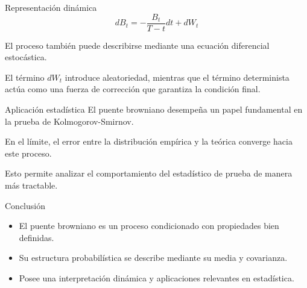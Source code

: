\documentclass{beamer}
\begin{document}
\begin{frame}{Representación dinámica}
\[
dB_t = -\frac{B_t}{T - t}dt + dW_t
\]

El proceso también puede describirse mediante una ecuación diferencial estocástica.

\vspace{0.3cm}
El término $dW_t$ introduce aleatoriedad, mientras que el término determinista actúa como una fuerza de corrección que garantiza la condición final.
\end{frame}

\begin{frame}{Aplicación estadística}
El puente browniano desempeña un papel fundamental en la prueba de Kolmogorov-Smirnov.

\vspace{0.3cm}
En el límite, el error entre la distribución empírica y la teórica converge hacia este proceso.

\vspace{0.3cm}
Esto permite analizar el comportamiento del estadístico de prueba de manera más tractable.
\end{frame}

\begin{frame}{Conclusión}
\begin{itemize}
    \item El puente browniano es un proceso condicionado con propiedades bien definidas.
    \item Su estructura probabilística se describe mediante su media y covarianza.
    \item Posee una interpretación dinámica y aplicaciones relevantes en estadística.
\end{itemize}
\end{frame}
\end{document}
